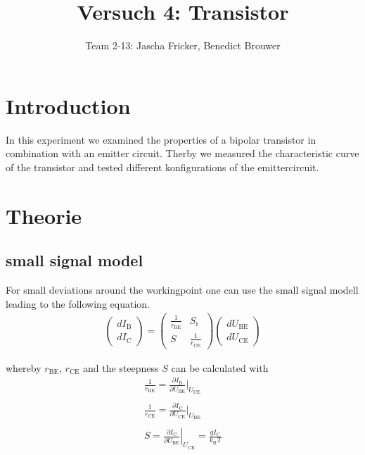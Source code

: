 \documentclass[11pt, a4paper]{article}
\title{Versuch 4: Transistor}
\author{Team 2-13: Jascha Fricker, Benedict Brouwer}
\begin{document}
    \maketitle

    \tableofcontents

    \newpage
\section{Introduction}
In this experiment we examined the properties of a bipolar transistor in combination with an emitter circuit. Therby we measured the characteristic curve 
of the transistor and tested different konfigurations of the emittercircuit.
\section{Theorie}

\subsection{small signal model}
For small deviations around the workingpoint one can use the small signal modell leading to the following equation.
\begin{align}
\left(\begin{array}{l}
    d I_{\mathrm{B}} \\
    d I_{\mathrm{C}}
    \end{array}\right)=\left(\begin{array}{cc}
    \frac{1}{r_{\mathrm{BE}}} & S_{\mathrm{r}} \\
    S & \frac{1}{r_{\mathrm{CE}}}
    \end{array}\right)\left(\begin{array}{l}
    d U_{\mathrm{BE}} \\
    d U_{\mathrm{CE}}
    \end{array}\right)
\end{align}

whereby $r_{\text{BE}}$, $r_{\text{CE}}$ and the steepness $S$ can be calculated with
\begin{align}
    \frac{1}{r_{\text{BE}}} = \frac{\partial I_{\text{B}}}{\partial U_{\text{BE}}} |_{U_{\text{CE}}} \label{eq:rbe} \\ \\
    \frac{1}{r_{\text{CE}}} = \frac{\partial I_{\text{C}}}{\partial U_{\text{CE}}} |_{U_{\text{BE}}} \label{eq:rce} \\ \\
    S=\left .\frac{\partial I_{\mathrm{C}}}{\partial U_{\mathrm{BE}}}\right |_{U_{\mathrm{CE}}}=\frac{q I_{\mathrm{C}}}{k_{\mathrm{B}} T} \label{eq:steep}
\end{align}
\end{document}
